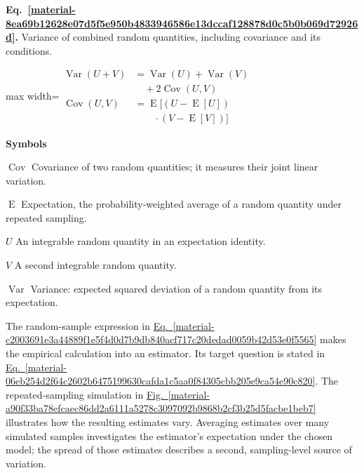 \documentclass[11pt,a4paper]{article}
\begin{document}
\par\medskip
\begin{samepage}
\label{material-8ea69b12628e07d5f5e950b4833946586e13dccaf128878d0c5b0b069d72926d}
\noindent\textbf{Eq.~\ref*{material-8ea69b12628e07d5f5e950b4833946586e13dccaf128878d0c5b0b069d72926d}.} Variance of combined random quantities, including covariance and its conditions.\par\nopagebreak
\begin{center}\begin{adjustbox}{max width=\linewidth}$\displaystyle \begin{aligned}\operatorname{Var}(U+V)&=\operatorname{Var}(U)+\operatorname{Var}(V)\\&\quad+2\operatorname{Cov}(U,V)\\\operatorname{Cov}(U,V)&=\operatorname{E}[(U-\operatorname{E}[U])\\&\qquad\cdot(V-\operatorname{E}[V])]\end{aligned}$\end{adjustbox}\end{center}

\par\noindent\textbf{Symbols}

\par\noindent\textbf{\(\operatorname{Cov}\)} Covariance of two random quantities; it measures their joint linear variation.

\par\noindent\textbf{\(\operatorname{E}\)} Expectation, the probability-weighted average of a random quantity under repeated sampling.

\par\noindent\textbf{\(U\)} An integrable random quantity in an expectation identity.

\par\noindent\textbf{\(V\)} A second integrable random quantity.

\par\noindent\textbf{\(\operatorname{Var}\)} Variance: expected squared deviation of a random quantity from its expectation.

\end{samepage}
\medskip

The random-sample expression in \hyperref[material-c2003691e3a44889f1e5f4d0d7b9db840acf717c20dedad0059b42d53e0f5565]{Eq.~\ref*{material-c2003691e3a44889f1e5f4d0d7b9db840acf717c20dedad0059b42d53e0f5565}} makes the empirical calculation into an estimator. Its target question is stated in \hyperref[material-06eb254d2f64c2602b6475199630cafda1c5aa0f84305cbb205e9ca54e90c820]{Eq.~\ref*{material-06eb254d2f64c2602b6475199630cafda1c5aa0f84305cbb205e9ca54e90c820}}. The repeated-sampling simulation in \hyperref[material-a90f33ba78efcaec86dd2a6111a5278c3097092b9868b2cf3b25d5facbe1beb7]{Fig.~\ref*{material-a90f33ba78efcaec86dd2a6111a5278c3097092b9868b2cf3b25d5facbe1beb7}} illustrates how the resulting estimates vary. Averaging estimates over many simulated samples investigates the estimator's expectation under the chosen model; the spread of those estimates describes a second, sampling-level source of variation.
\end{document}

